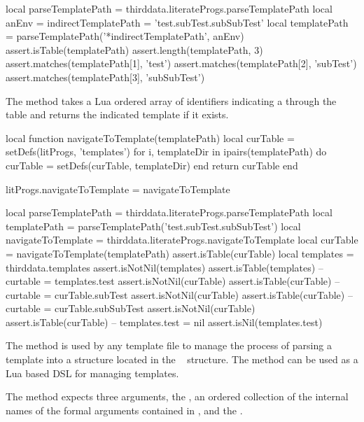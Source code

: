 {{

\startLuaTest
local parseTemplatePath = thirddata.literateProgs.parseTemplatePath
local anEnv = {
  indirectTemplatePath = 'test.subTest.subSubTest'
}
local templatePath = parseTemplatePath('*indirectTemplatePath', anEnv)
assert.isTable(templatePath)
assert.length(templatePath, 3)
assert.matches(templatePath[1], 'test')
assert.matches(templatePath[2], 'subTest')
assert.matches(templatePath[3], 'subSubTest')
\stopLuaTest
\stopTestCase
\stopTestSuite

\startTestSuite[navigateToTemplate]

The  method takes a Lua ordered array of 
identifiers indicating a  through the 
 table and returns the indicated 
template if it exists. 

\startLuaCode
local function navigateToTemplate(templatePath)
  local curTable = setDefs(litProgs, 'templates')
  for i, templateDir in ipairs(templatePath) do
    curTable = setDefs(curTable, templateDir)
  end
  return curTable
end

litProgs.navigateToTemplate = navigateToTemplate
\stopLuaCode

\startLuaTest
local parseTemplatePath = thirddata.literateProgs.parseTemplatePath
local templatePath = parseTemplatePath('test.subTest.subSubTest')
local navigateToTemplate = thirddata.literateProgs.navigateToTemplate
local curTable = navigateToTemplate(templatePath)
assert.isTable(curTable)
local templates = thirddata.templates
assert.isNotNil(templates)
assert.isTable(templates)
--
curtable = templates.test
assert.isNotNil(curTable)
assert.isTable(curTable)
--
curtable = curTable.subTest
assert.isNotNil(curTable)
assert.isTable(curTable)
--
curtable = curTable.subSubTest
assert.isNotNil(curTable)
assert.isTable(curTable)
--
templates.test = nil
assert.isNil(templates.test)
\stopLuaTest
\stopTestCase
\stopTestSuite

\startTestSuite[addTemplate]

The  method is used by any template file to manage the 
process of parsing a template into a structure located in the \ConTeXt\ 
 structure. The  
method can be used as a Lua based DSL for managing templates. 

The  method expects three arguments, the 
, an ordered collection of the internal names of the 
formal arguments contained in \type{templateArgs}, and the 
. 

}}
